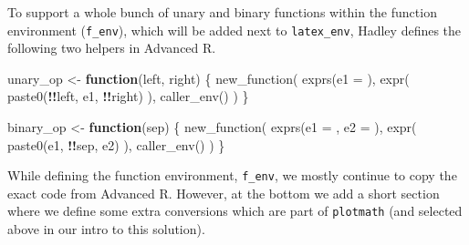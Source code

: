\documentclass[
]{krantz}
\makeatletter
\newenvironment{Shaded}{\begin{snugshade}}{\end{snugshade}}
\newcommand{\ControlFlowTok}[1]{\textcolor[rgb]{0.13,0.29,0.53}{\textbf{#1}}}
\newcommand{\DataTypeTok}[1]{\textcolor[rgb]{0.13,0.29,0.53}{#1}}
\newcommand{\KeywordTok}[1]{\textcolor[rgb]{0.13,0.29,0.53}{\textbf{#1}}}
\newcommand{\NormalTok}[1]{#1}
\newcommand{\OperatorTok}[1]{\textcolor[rgb]{0.81,0.36,0.00}{\textbf{#1}}}
\newcommand{\StringTok}[1]{\textcolor[rgb]{0.31,0.60,0.02}{#1}}
\newenvironment{kframe}{%
\medskip{}
\setlength{\fboxsep}{.8em}
 \def\at@end@of@kframe{}%
 \ifinner\ifhmode%
  \def\at@end@of@kframe{\end{minipage}}%
  \begin{minipage}{\columnwidth}%
 \fi\fi%
 \def\FrameCommand##1{\hskip\@totalleftmargin \hskip-\fboxsep
 \colorbox{shadecolor}{##1}\hskip-\fboxsep
     \hskip-\linewidth \hskip-\@totalleftmargin \hskip\columnwidth}%
 \MakeFramed {\advance\hsize-\width
   \@totalleftmargin\z@ \linewidth\hsize
   \@setminipage}}%
 {\par\unskip\endMakeFramed%
 \at@end@of@kframe}
\renewenvironment{Shaded}{\begin{kframe}}{\end{kframe}}
\renewcommand{\KeywordTok} [1]{\textcolor[rgb]{0.00,0.44,0.13}{{#1}}}
\renewcommand{\DataTypeTok}[1]{\textcolor[rgb]{0.56,0.13,0.00}{{#1}}}
\renewcommand{\StringTok}  [1]{\textcolor[rgb]{0.25,0.44,0.63}{{#1}}}
\renewcommand{\NormalTok}  [1]{{#1}}
\makeatother
\begin{document}
To support a whole bunch of unary and binary functions within the function environment (\texttt{f\_env}), which will be added next to \texttt{latex\_env}, Hadley defines the following two helpers in Advanced R.

\begin{Shaded}
\begin{Highlighting}[]
\NormalTok{unary_op <-}\StringTok{ }\ControlFlowTok{function}\NormalTok{(left, right) \{}
  \KeywordTok{new_function}\NormalTok{(}
    \KeywordTok{exprs}\NormalTok{(}\DataTypeTok{e1 =}\NormalTok{ ),}
    \KeywordTok{expr}\NormalTok{(}
      \KeywordTok{paste0}\NormalTok{(}\OperatorTok{!!}\NormalTok{left, e1, }\OperatorTok{!!}\NormalTok{right)}
\NormalTok{    ),}
    \KeywordTok{caller_env}\NormalTok{()}
\NormalTok{  )}
\NormalTok{\}}

\NormalTok{binary_op <-}\StringTok{ }\ControlFlowTok{function}\NormalTok{(sep) \{}
  \KeywordTok{new_function}\NormalTok{(}
    \KeywordTok{exprs}\NormalTok{(}\DataTypeTok{e1 =}\NormalTok{ , }\DataTypeTok{e2 =}\NormalTok{ ),}
    \KeywordTok{expr}\NormalTok{(}
      \KeywordTok{paste0}\NormalTok{(e1, }\OperatorTok{!!}\NormalTok{sep, e2)}
\NormalTok{    ),}
    \KeywordTok{caller_env}\NormalTok{()}
\NormalTok{  )}
\NormalTok{\}}
\end{Highlighting}
\end{Shaded}

While defining the function environment, \texttt{f\_env}, we mostly continue to copy the exact code from Advanced R. However, at the bottom we add a short section where we define some extra conversions which are part of \texttt{plotmath} (and selected above in our intro to this solution).
\end{document}
